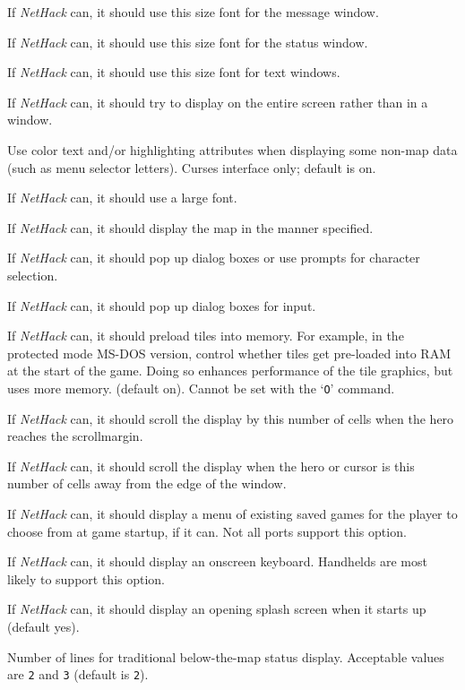 \documentclass[titlepage]{article}
\begin{document}
\begin{description}[font=\mdseries\itshape]
\item[font\textunderscore size\textunderscore message]
If \textit{NetHack} can, it should use this size font for the message window.
\item[font\textunderscore size\textunderscore status]
If \textit{NetHack} can, it should use this size font for the status window.
\item[font\textunderscore size\textunderscore text]
If \textit{NetHack} can, it should use this size font for text windows.
\item[fullscreen]
If \textit{NetHack} can, it should try to display on the entire screen rather than in a window.
\item[guicolor]
Use color text and/or highlighting attributes when displaying some
non-map data (such as menu selector letters).
Curses interface only; default is on.
\item[large\textunderscore font]
If \textit{NetHack} can, it should use a large font.
\item[map\textunderscore mode]
If \textit{NetHack} can, it should display the map in the manner specified.
\item[player\textunderscore selection]
If \textit{NetHack} can, it should pop up dialog boxes or use prompts for character selection.
\item[popup\textunderscore dialog]
If \textit{NetHack} can, it should pop up dialog boxes for input.
\item[preload\textunderscore tiles]
If \textit{NetHack} can, it should preload tiles into memory.
For example, in the protected mode MS-DOS version, control whether tiles
get pre-loaded into RAM at the start of the game.  Doing so
enhances performance of the tile graphics, but uses more memory. (default on).
Cannot be set with the `\texttt{O}' command.
\item[scroll\textunderscore amount]
If \textit{NetHack} can, it should scroll the display by this number of cells
when the hero reaches the scroll\textunderscore margin.
\item[scroll\textunderscore margin]
If \textit{NetHack} can, it should scroll the display when the hero or cursor
is this number of cells away from the edge of the window.
\item[selectsaved]
If \textit{NetHack} can, it should display a menu of existing saved games for the player to
choose from at game startup, if it can. Not all ports support this option.
\item[softkeyboard]
If \textit{NetHack} can, it should display an onscreen keyboard.
Handhelds are most likely to support this option.
\item[splash\textunderscore screen]
If \textit{NetHack} can, it should display an opening splash screen when
it starts up (default yes).
\item[statuslines]
Number of lines for traditional below-the-map status display.
Acceptable values are \texttt{2} and \texttt{3} (default is \texttt{2}).


\end{description}
\end{document}

